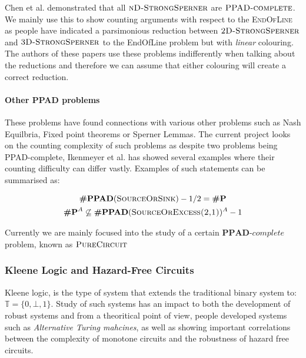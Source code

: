 Chen et al. \cite{chen_SettlingComplexityComputing_2009} demonstrated 
that all $\textsc{nD-StrongSperner}$ are $\textsc{PPAD-complete}$.
We mainly use this to show counting arguments with respect to the
\textsc{EndOfLine} as people have indicated a parsimonious reduction
between $\textsc{2D-StrongSperner}$ 
and $\textsc{3D-StrongSperner}$ to the EndOfLine problem but 
with \textit{linear} colouring. The authors of these papers
use these problems indifferently when talking about the reductions
and therefore we can assume that either colouring will create a correct reduction.

\paragraph{Other PPAD problems}






These problems have found
connections with various other problems such as Nash Equilbria,
Fixed point theorems or Sperner Lemmas. The current project looks
on the counting complexity of such problems as despite two problems
being PPAD-complete, Ikenmeyer et al. \cite{pak_WhatCombinatorialInterpretation_2022} has showed several examples where
their counting difficulty can differ vastly. Examples of such statements
can be summarised as:

\begin{gather*}
    \textbf{\#PPAD}(\textsc{SourceOrSink})-1/2  = \textbf{\#P}\\
    \textbf{\#P}^A \not\subseteq \textbf{\#PPAD}(\textsc{SourceOrExcess(2,1)})^A-1
\end{gather*} 


Currently we are mainly focused into the study of a certain 
$\textbf{PPAD}\textit{-complete}$ problem, known as $\textsc{PureCircuit}$

\subsubsection{Kleene Logic and Hazard-Free Circuits}

Kleene logic, is the type of system that extends the traditional %
binary system to: $\mathbb{T} = \{0, \bot,1 \}$. 
Study of such systems has an impact to both
the development of robust systems and from a theoritical point of view,
people developed systems such as \textit{Alternative Turing mahcines}, as well as
showing important correlations between the complexity of monotone circuits
and the robustness of hazard free circuits. 


